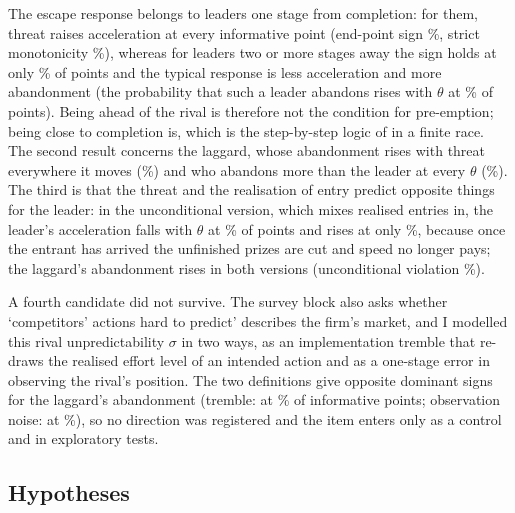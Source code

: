 \documentclass[preprint,12pt,authoryear]{elsarticle}
\begin{document}
The escape response belongs to leaders one stage from completion: for them, threat raises acceleration at every informative point (end-point sign \ModelPOneHolds\%, strict monotonicity \ModelPOneStrict\%), whereas for leaders two or more stages away the sign holds at only \ModelPOneFarHolds\% of points and the typical response is less acceleration and more abandonment (the probability that such a leader abandons rises with $\theta$ at \ModelPTwoLFarThrUp\% of points). Being ahead of the rival is therefore not the condition for pre-emption; being close to completion is, which is the step-by-step logic of \citet{aghion2009entry} in a finite race. The second result concerns the laggard, whose abandonment rises with threat everywhere it moves (\ModelPTwoHolds\%) and who abandons more than the leader at every $\theta$ (\ModelPSevenHolds\%). The third is that the threat and the realisation of entry predict opposite things for the leader: in the unconditional version, which mixes realised entries in, the leader's acceleration falls with $\theta$ at \ModelPOneUncViolated\% of points and rises at only \ModelPOneUncHolds\%, because once the entrant has arrived the unfinished prizes are cut and speed no longer pays; the laggard's abandonment rises in both versions (unconditional violation \ModelPTwoUncViolated\%).

A fourth candidate did not survive. The survey block also asks whether `competitors' actions hard to predict' describes the firm's market, and I modelled this rival unpredictability $\sigma$ in two ways, as an implementation tremble that re-draws the realised effort level of an intended action and as a one-stage error in observing the rival's position. The two definitions give opposite dominant signs for the laggard's abandonment (tremble: \ModelPFiveTrembleDir{} at \ModelPFiveTrembleShare\% of informative points; observation noise: \ModelPFiveObsNoiseDir{} at \ModelPFiveObsNoiseShare\%), so no direction was registered and the item enters only as a control and in exploratory tests.

\subsection{Hypotheses}
\end{document}
